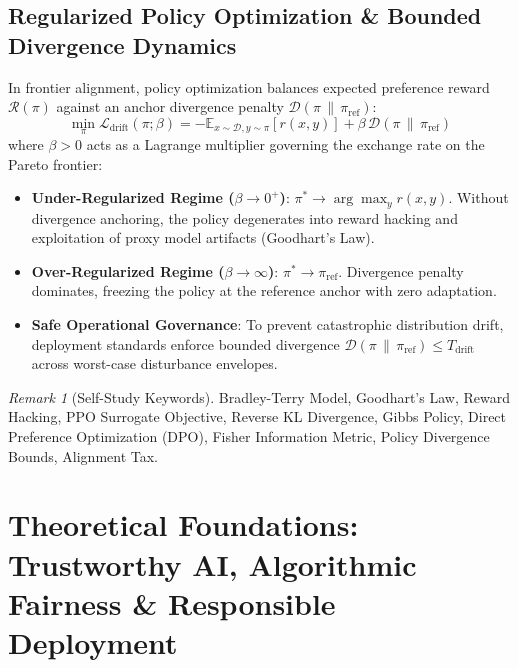 \documentclass[11pt,a4paper]{article}
\theoremstyle{definition}
\theoremstyle{plain}
\theoremstyle{remark}
\newtheorem*{remark}{Remark}
\begin{document}
\subsection{Regularized Policy Optimization \& Bounded Divergence Dynamics}
In frontier alignment, policy optimization balances expected preference reward $\mathcal{R}(\pi)$ against an anchor divergence penalty $\mathcal{D}(\pi \,\|\, \pi_{\mathrm{ref}})$:
\begin{equation}
\min_{\pi} \mathcal{L}_{\mathrm{drift}}(\pi; \beta) = -\mathbb{E}_{x \sim \mathcal{D}, y \sim \pi}[r(x, y)] + \beta \, \mathcal{D}(\pi \,\|\, \pi_{\mathrm{ref}})
\end{equation}
where $\beta > 0$ acts as a Lagrange multiplier governing the exchange rate on the Pareto frontier:
\begin{itemize}[noitemsep]
    \item \textbf{Under-Regularized Regime ($\beta \to 0^+$)}: $\pi^* \to \arg\max_y r(x, y)$. Without divergence anchoring, the policy degenerates into reward hacking and exploitation of proxy model artifacts (Goodhart's Law).
    \item \textbf{Over-Regularized Regime ($\beta \to \infty$)}: $\pi^* \to \pi_{\mathrm{ref}}$. Divergence penalty dominates, freezing the policy at the reference anchor with zero adaptation.
    \item \textbf{Safe Operational Governance}: To prevent catastrophic distribution drift, deployment standards enforce bounded divergence $\mathcal{D}(\pi \,\|\, \pi_{\mathrm{ref}}) \le T_{\mathrm{drift}}$ across worst-case disturbance envelopes.
\end{itemize}

\begin{remark}[Self-Study Keywords]
Bradley-Terry Model, Goodhart's Law, Reward Hacking, PPO Surrogate Objective, Reverse KL Divergence, Gibbs Policy, Direct Preference Optimization (DPO), Fisher Information Metric, Policy Divergence Bounds, Alignment Tax.
\end{remark}

\section{Theoretical Foundations: Trustworthy AI, Algorithmic Fairness \& Responsible Deployment}
\end{document}
